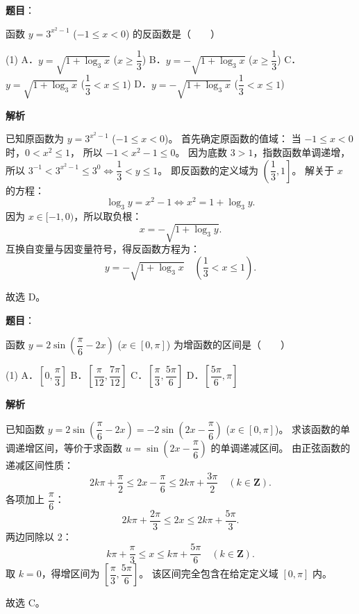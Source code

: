 \begin{answer}

\textbf{题目}：

函数 $y = 3^{x^2 - 1}$ ($-1 \le x < 0$) 的反函数是\mbox{（　　）}

\begin{gkopts}(1)
\task A．$y = \sqrt{1 + \log_3 x}$ ($x \ge \dfrac{1}{3}$)
\task B．$y = -\sqrt{1 + \log_3 x}$ ($x \ge \dfrac{1}{3}$)
\task C．$y = \sqrt{1 + \log_3 x}$ ($\dfrac{1}{3} < x \le 1$)
\task D．$y = -\sqrt{1 + \log_3 x}$ ($\dfrac{1}{3} < x \le 1$)
\end{gkopts}

\textbf{解析}

已知原函数为 $y = 3^{x^2 - 1}$ ($-1 \le x < 0$)。
首先确定原函数的值域：
当 $-1 \le x < 0$ 时，$0 < x^2 \le 1$，
所以 $-1 < x^2 - 1 \le 0$。
因为底数 $3 > 1$，指数函数单调递增，
所以 $3^{-1} < 3^{x^2 - 1} \le 3^0 \iff \dfrac{1}{3} < y \le 1$。
即反函数的定义域为 $\left(\dfrac{1}{3}, 1\right]$。
解关于 $x$ 的方程：
\nopagebreak[4]
\[
\log_3 y = x^2 - 1 \iff x^2 = 1 + \log_3 y.
\]
因为 $x \in [-1, 0)$，所以取负根：
\nopagebreak[4]
\[
x = -\sqrt{1 + \log_3 y}.
\]
互换自变量与因变量符号，得反函数方程为：
\nopagebreak[4]
\[
y = -\sqrt{1 + \log_3 x} \quad \left(\dfrac{1}{3} < x \le 1\right).
\]

故选 D。


\end{answer}
\begin{answer}

\textbf{题目}：

函数 $y = 2\sin\left(\dfrac{\pi}{6} - 2x\right)$ ($x \in [0, \pi]$) 为增函数的区间是\mbox{（　　）}

\begin{gkopts}(1)
\task A．$\left[0, \dfrac{\pi}{3}\right]$
\task B．$\left[\dfrac{\pi}{12}, \dfrac{7\pi}{12}\right]$
\task C．$\left[\dfrac{\pi}{3}, \dfrac{5\pi}{6}\right]$
\task D．$\left[\dfrac{5\pi}{6}, \pi\right]$
\end{gkopts}

\textbf{解析}

已知函数 $y = 2\sin\left(\dfrac{\pi}{6} - 2x\right) = -2\sin\left(2x - \dfrac{\pi}{6}\right)$ ($x \in [0, \pi]$)。
求该函数的单调递增区间，等价于求函数 $u = \sin\left(2x - \dfrac{\pi}{6}\right)$ 的单调递减区间。
由正弦函数的递减区间性质：
\nopagebreak[4]
\[
2k\pi + \dfrac{\pi}{2} \le 2x - \dfrac{\pi}{6} \le 2k\pi + \dfrac{3\pi}{2} \quad (k \in \mathbf{Z}).
\]
各项加上 $\dfrac{\pi}{6}$：
\nopagebreak[4]
\[
2k\pi + \dfrac{2\pi}{3} \le 2x \le 2k\pi + \dfrac{5\pi}{3}.
\]
两边同除以 2：
\nopagebreak[4]
\[
k\pi + \dfrac{\pi}{3} \le x \le k\pi + \dfrac{5\pi}{6} \quad (k \in \mathbf{Z}).
\]
取 $k = 0$，得增区间为 $\left[\dfrac{\pi}{3}, \dfrac{5\pi}{6}\right]$。
该区间完全包含在给定定义域 $[0, \pi]$ 内。

故选 C。


\end{answer}
